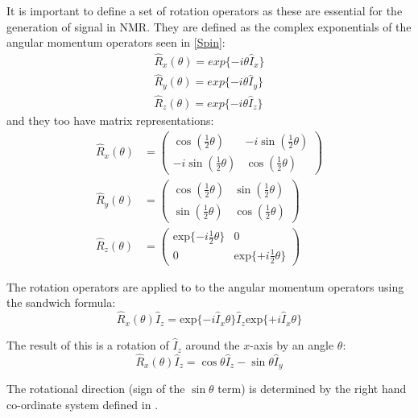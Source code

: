 It is important to define a set of rotation operators as these are essential for the generation of signal in NMR. They are defined as the complex exponentials of the
angular momentum operators seen in \ref{Spin}:
\begin{align}\label{eqn:RotOp}
  \hat{R}_x(\theta) = exp\{-i\theta\hat{I}_x\}\\
  \hat{R}_y(\theta) = exp\{-i\theta\hat{I}_y\}\\
  \hat{R}_z(\theta) = exp\{-i\theta\hat{I}_z\}
\end{align}
 and they too have matrix representations:
 \begin{align}\label{eqn:RotMat}
   \hat{R}_x(\theta)& = \begin{pmatrix}
      \cos(\frac{1}{2}\theta) & -i\sin(\frac{1}{2}\theta)\\
      -i\sin(\frac{1}{2}\theta) & \cos(\frac{1}{2}\theta)
 \end{pmatrix}\\
 \hat{R}_y(\theta)& = \begin{pmatrix}
    \cos(\frac{1}{2}\theta) & \sin(\frac{1}{2}\theta)\\
    \sin(\frac{1}{2}\theta) & \cos(\frac{1}{2}\theta)
\end{pmatrix}\\
\hat{R}_z(\theta)& = \begin{pmatrix}
    \text{exp}\{-i\frac{1}{2}\theta\} & 0\\
    0 & \text{exp}\{+i\frac{1}{2}\theta\}
\end{pmatrix}
 \end{align}


The rotation operators are applied to to the angular momentum operators using the sandwich formula:
\begin{equation}
  \hat{R}_x(\theta)\hat{I}_z = \text{exp}\{-i\hat{I}_x\theta\}\hat{I}_z\text{exp}\{+i\hat{I}_x\theta\}
\end{equation}

The result of this is a rotation of $\hat{I}_z$ around the $x$-axis by an angle $\theta$:
\begin{equation}
  \hat{R}_x(\theta)\hat{I}_z = \cos{\theta}\hat{I}_z - \sin{\theta}\hat{I}_y
\end{equation}

The rotational direction (sign of the $\sin{\theta}$ term) is determined by the right hand co-ordinate system defined in .


